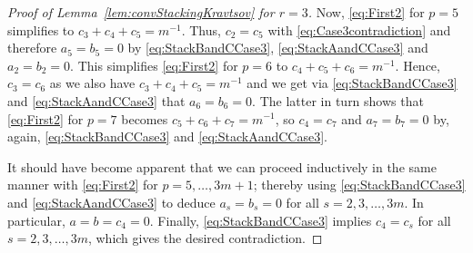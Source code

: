 \begin{proof}[Proof of Lemma~\ref{lem:convStackingKravtsov} for $r=3$]
	Now, \eqref{eq:First2} for $p=5$ simplifies to $c_3 + c_4 + c_5 = m^{-1}$. Thus, $c_2 = c_5$ with \eqref{eq:Case3contradiction} and therefore $a_5 = b_5 = 0$ by \eqref{eq:StackBandCCase3}, \eqref{eq:StackAandCCase3} and $a_2=b_2=0$. This simplifies \eqref{eq:First2} for $p=6$ to $c_4 + c_5 + c_6 = m^{-1}$. Hence, $c_3 = c_6$ as we also have $c_3 + c_4 + c_5 = m^{-1}$ and we get via \eqref{eq:StackBandCCase3} and \eqref{eq:StackAandCCase3} that $a_6 = b_6 = 0$. The latter in turn shows that \eqref{eq:First2} for $p=7$ becomes $c_5 + c_6 + c_7 = m^{-1}$, so $c_4 = c_7$ and $a_7 = b_7 = 0$ by, again, \eqref{eq:StackBandCCase3} and \eqref{eq:StackAandCCase3}.
	
	It should have become apparent that we can proceed inductively in the same manner with \eqref{eq:First2} for $p=5,\ldots,3m+1$; thereby using \eqref{eq:StackBandCCase3} and \eqref{eq:StackAandCCase3} to deduce $a_s = b_s = 0$ for all $s=2,3,\ldots,3m$. In particular, $a = b = c_4 = 0$. Finally, \eqref{eq:StackBandCCase3} implies $c_4 = c_s$ for all $s=2,3,\ldots,3m$, which gives the desired contradiction.
\end{proof}



